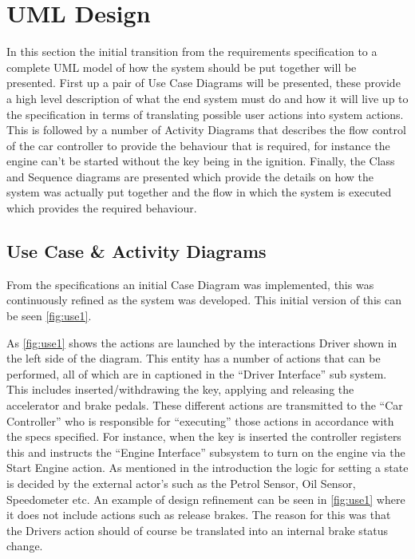 \documentclass[12pt]{article}
\begin{document}
\section{UML Design}

In this section the initial transition from the requirements specification to a complete UML model of how the system should be put together will be presented. First up a pair of Use Case Diagrams will be presented, these provide a high level description of what the end system must do and how it will live up to the specification in terms of translating possible user actions into system actions. This is followed by a number of Activity Diagrams that describes the flow control of the car controller to provide the behaviour that is required, for instance the engine can’t be started without the key being in the ignition. Finally, the Class and Sequence diagrams are presented which provide the details on how the system was actually put together and the flow in which the system is executed which provides the required behaviour.

\subsection{Use Case \& Activity Diagrams}
	From the specifications an initial Case Diagram was implemented, this was continuously refined as the system was developed. This initial version of this can be seen \ref{fig:use1}.
	
	As \ref{fig:use1} shows the actions are launched by the interactions Driver shown in the left side of the diagram. This entity has a number of actions that can be performed, all of which are in captioned in the “Driver Interface” sub system. This includes inserted/withdrawing the key, applying and releasing the accelerator and brake pedals. These different actions are transmitted to the “Car Controller” who is responsible for “executing” those actions in accordance with the specs specified. For instance, when the key is inserted the controller registers this and instructs the “Engine Interface” subsystem to turn on the engine via the Start Engine action. As mentioned in the introduction the logic for setting a state is decided by the external actor’s such as the Petrol Sensor, Oil Sensor, Speedometer etc. An example of design refinement can be seen in \ref{fig:use1} where it does not include actions such as release brakes. The reason for this was that the Drivers action should of course be translated into an internal brake status change.
	
\end{document}
